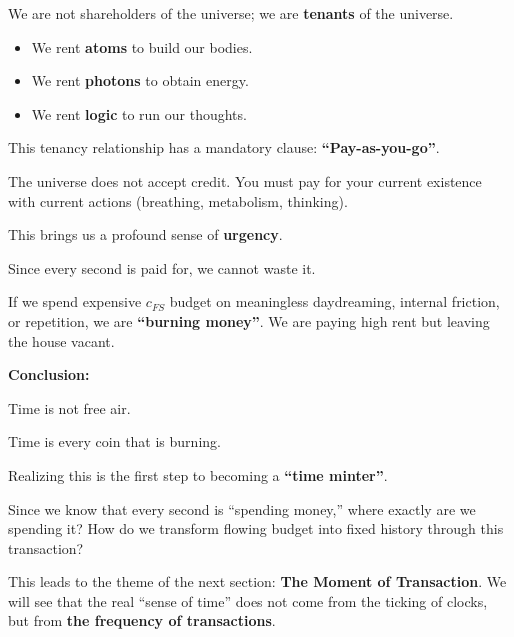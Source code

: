 We are not shareholders of the universe; we are \textbf{tenants} of the universe.

\begin{itemize}
\item We rent \textbf{atoms} to build our bodies.

\item We rent \textbf{photons} to obtain energy.

\item We rent \textbf{logic} to run our thoughts.
\end{itemize}

This tenancy relationship has a mandatory clause: \textbf{``Pay-as-you-go''}.

The universe does not accept credit. You must pay for your current existence with current actions (breathing, metabolism, thinking).

This brings us a profound sense of \textbf{urgency}.

Since every second is paid for, we cannot waste it.

If we spend expensive $c_{FS}$ budget on meaningless daydreaming, internal friction, or repetition, we are \textbf{``burning money''}. We are paying high rent but leaving the house vacant.

\textbf{Conclusion:}

Time is not free air.

Time is every coin that is burning.

Realizing this is the first step to becoming a \textbf{``time minter''}.

Since we know that every second is ``spending money,'' where exactly are we spending it? How do we transform flowing budget into fixed history through this transaction?

This leads to the theme of the next section: \textbf{The Moment of Transaction}. We will see that the real ``sense of time'' does not come from the ticking of clocks, but from \textbf{the frequency of transactions}.

